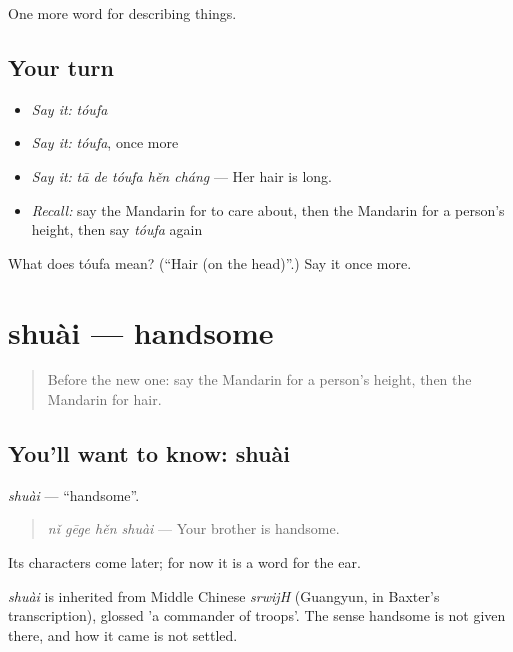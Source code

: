 \begin{grammarlens}[title={What you've built}]
One more word for describing things.
\end{grammarlens}

\subsection*{Your turn}
\begin{itemize}
\raggedright
  \item \emph{Say it:} \emph{tóufa}
  \item \emph{Say it:} \emph{tóufa}, once more
  \item \emph{Say it:} \emph{tā de tóufa hěn cháng} — Her hair is long.
  \item \emph{Recall:} say the Mandarin for to care about, then the Mandarin for a person's height, then say \emph{tóufa} again
\end{itemize}

\begin{tcolorbox}[breakable,colback=teal!4,colframe=teal!35!black,title={Before you move on}]
What does tóufa mean? (\textquotedblleft{}Hair (on the head)\textquotedblright{}.) Say it once more.
\end{tcolorbox}
\section[shuài]{shuài — handsome}

\label{lesson:ZH-C124-shuai}



\begin{quote}
Before the new one: say the Mandarin for a person's height, then the Mandarin for hair.
\end{quote}

\subsection*{You'll want to know: shuài}
\emph{shuài} — \textquotedblleft{}handsome\textquotedblright{}.

\begin{quote}
\emph{nǐ gēge hěn shuài} — Your brother is handsome.
\end{quote}

Its characters come later; for now it is a word for the ear.

\begin{cousinweb}
\emph{shuài} is inherited from Middle Chinese \emph{srwijH} (Guangyun, in Baxter's transcription), glossed 'a commander of troops'. The sense handsome is not given there, and how it came is not settled.
\end{cousinweb}

